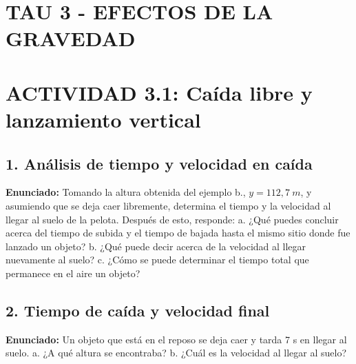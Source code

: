 \documentclass[12pt, letterpaper]{article}
\begin{document}
	\section*{TAU 3 - EFECTOS DE LA GRAVEDAD}
	
	\section*{ACTIVIDAD 3.1: Caída libre y lanzamiento vertical}
	
	\subsection*{1. Análisis de tiempo y velocidad en caída}
	\noindent \textbf{Enunciado:} Tomando la altura obtenida del ejemplo b., $y=112,7~m$, y asumiendo que se deja caer libremente, determina el tiempo y la velocidad al llegar al suelo de la pelota. Después de esto, responde: a. ¿Qué puedes concluir acerca del tiempo de subida y el tiempo de bajada hasta el mismo sitio donde fue lanzado un objeto? b. ¿Qué puede decir acerca de la velocidad al llegar nuevamente al suelo? c. ¿Cómo se puede determinar el tiempo total que permanece en el aire un objeto?
	
	
	\subsection*{2. Tiempo de caída y velocidad final}
	\noindent \textbf{Enunciado:} Un objeto que está en el reposo se deja caer y tarda 7 s en llegar al suelo. a. ¿A qué altura se encontraba? b. ¿Cuál es la velocidad al llegar al suelo?
	
\end{document}
